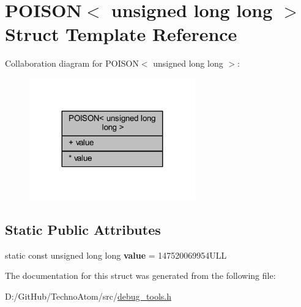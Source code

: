 \hypertarget{struct_p_o_i_s_o_n_3_01unsigned_01long_01long_01_4}{}\section{P\+O\+I\+S\+ON$<$ unsigned long long $>$ Struct Template Reference}
\label{struct_p_o_i_s_o_n_3_01unsigned_01long_01long_01_4}


Collaboration diagram for P\+O\+I\+S\+ON$<$ unsigned long long $>$\+:
\nopagebreak
\begin{figure}[H]
\begin{center}
\leavevmode
\includegraphics[width=203pt]{struct_p_o_i_s_o_n_3_01unsigned_01long_01long_01_4__coll__graph}
\end{center}
\end{figure}
\subsection*{Static Public Attributes}
\textbf{ }\par
\begin{DoxyCompactItemize}
\item 
\mbox{\label{struct_p_o_i_s_o_n_3_01unsigned_01long_01long_01_4_aaeb0e299161215b97c3121c6374c5d24}} 
static const unsigned long long {\bfseries value} = 147520069954\+U\+LL
\end{DoxyCompactItemize}



The documentation for this struct was generated from the following file\+:\begin{DoxyCompactItemize}
\item 
D\+:/\+Git\+Hub/\+Techno\+Atom/src/\hyperlink{debug__tools_8h}{debug\+\_\+tools.\+h}\end{DoxyCompactItemize}
